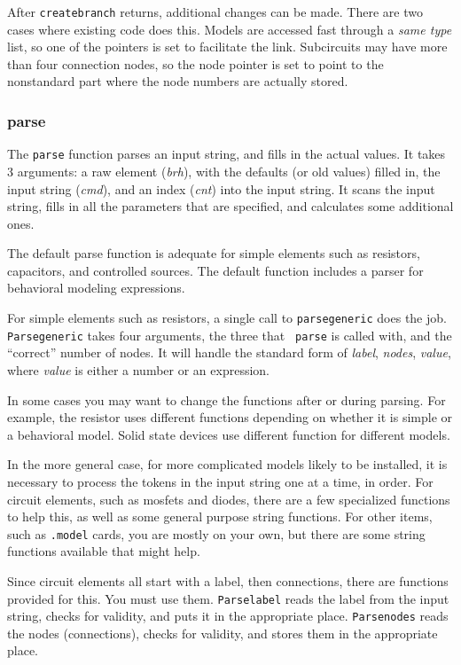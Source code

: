 After {\tt createbranch} returns, additional changes can be made.  There are
two cases where existing code does this.  Models are accessed fast through a
{\em same type} list, so one of the pointers is set to facilitate the link.
Subcircuits may have more than four connection nodes, so the node pointer is
set to point to the nonstandard part where the node numbers are actually
stored.
\subsubsection{parse}

The {\tt parse} function parses an input string, and fills in the actual
values.  It takes 3 arguments: a raw element ({\em brh}), with the
defaults (or old values) filled in, the input string ({\em cmd}), and an
index ({\em cnt}) into the input string.  It scans the input string, fills
in all the parameters that are specified, and calculates some additional
ones.

The default parse function is adequate for simple elements such as resistors, capacitors, and controlled sources.  The default function includes a parser for behavioral modeling expressions.

For simple elements such as resistors, a single call to {\tt parsegeneric}
does the job.  {\tt Parsegeneric} takes four arguments, the three that {\tt
parse} is called with, and the ``correct'' number of nodes.  It will handle
the standard form of {\em label}, {\em nodes}, {\em value}, where {\em
value} is either a number or an expression.  

In some cases you may want to change the functions after or during parsing.
For example, the resistor uses different functions depending on whether it
is simple or a behavioral model.  Solid state devices use different function
for different models.

In the more general case, for more complicated models likely to be
installed, it is necessary to process the tokens in the input string one at
a time, in order.  For circuit elements, such as mosfets and diodes, there
are a few specialized functions to help this, as well as some general
purpose string functions.  For other items, such as {\tt .model} cards, you
are mostly on your own, but there are some string functions available that
might help.

Since circuit elements all start with a label, then connections, there are
functions provided for this.  You must use them.  {\tt Parselabel} reads the
label from the input string, checks for validity, and puts it in the
appropriate place.  {\tt Parsenodes} reads the nodes (connections), checks
for validity, and stores them in the appropriate place.

